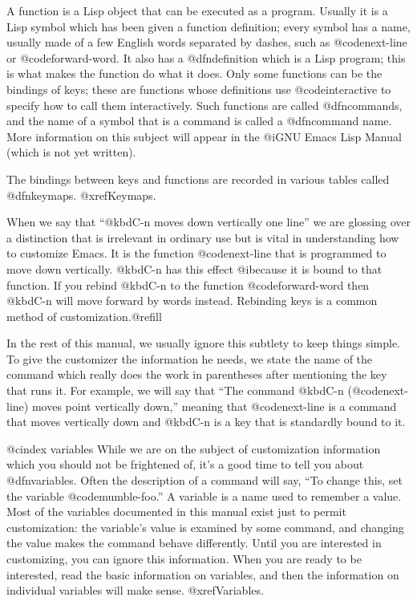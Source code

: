 {{  A function is a Lisp object that can be executed as a program.
Usually it is a Lisp symbol which has been given a function definition;
every symbol has a name, usually made of a few English words separated by
dashes, such as @code{next-line} or @code{forward-word}.  It also has a
@dfn{definition} which is a Lisp program; this is what makes the function
do what it does.  Only some functions can be the bindings of keys; these
are functions whose definitions use @code{interactive} to specify how to
call them interactively.  Such functions are called @dfn{commands}, and
the name of a symbol that is a command is called a @dfn{command name}.
More information on this subject will appear in the @i{GNU Emacs Lisp
Manual} (which is not yet written).

  The bindings between keys and functions are recorded in various tables
called @dfn{keymaps}.  @xref{Keymaps}.

  When we say that ``@kbd{C-n} moves down vertically one line'' we are
glossing over a distinction that is irrelevant in ordinary use but is vital
in understanding how to customize Emacs.  It is the function
@code{next-line} that is programmed to move down vertically.  @kbd{C-n} has
this effect @i{because} it is bound to that function.  If you rebind
@kbd{C-n} to the function @code{forward-word} then @kbd{C-n} will move
forward by words instead.  Rebinding keys is a common method of
customization.@refill

  In the rest of this manual, we usually ignore this subtlety to keep
things simple.  To give the customizer the information he needs, we
state the name of the command which really does the work in parentheses
after mentioning the key that runs it.  For example, we will say that
``The command @kbd{C-n} (@code{next-line}) moves point vertically down,''
meaning that @code{next-line} is a command that moves vertically down
and @kbd{C-n} is a key that is standardly bound to it.

@cindex variables
  While we are on the subject of customization information which you should
not be frightened of, it's a good time to tell you about @dfn{variables}.
Often the description of a command will say, ``To change this, set the
variable @code{mumble-foo}.''  A variable is a name used to remember a
value.  Most of the variables documented in this manual exist just to
permit customization: the variable's value is examined by some command,
and changing the value makes the command behave differently.  Until you
are interested in customizing,  you can ignore this information.  When you
are ready to be interested, read the basic information on variables, and
then the information on individual variables will make sense.
@xref{Variables}.

}}
